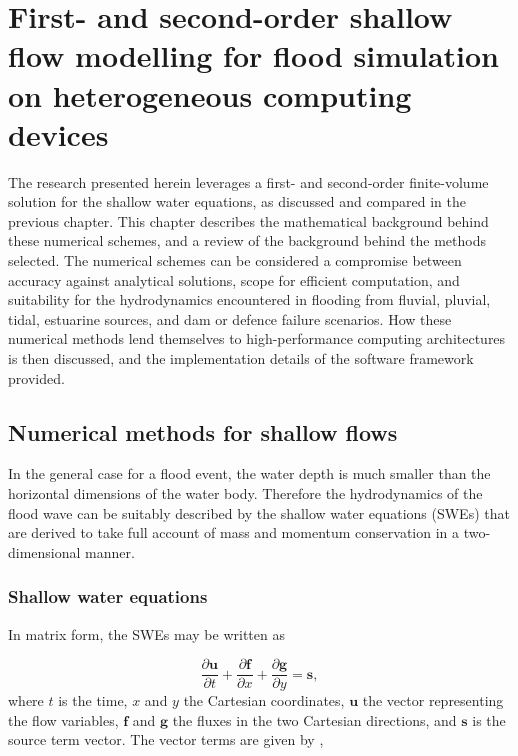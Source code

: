 \chapter{First- and second-order shallow flow modelling for flood simulation on heterogeneous computing devices}
\label{chapter:NumericalMethods}

The research presented herein leverages a first- and second-order finite-volume solution for the shallow water equations, as discussed and compared in the previous chapter. This chapter describes the mathematical background behind these numerical schemes, and a review of the background behind the methods selected. The numerical schemes can be considered a compromise between accuracy against analytical solutions, scope for efficient computation, and suitability for the hydrodynamics encountered in flooding from fluvial, pluvial, tidal, estuarine sources, and dam or defence failure scenarios. How these numerical methods lend themselves to high-performance computing architectures is then discussed, and the implementation details of the software framework provided.

\section{Numerical methods for shallow flows}

In the general case for a flood event, the water depth is much smaller than the horizontal dimensions of the water body. Therefore the hydrodynamics of the flood wave can be suitably described by the shallow water equations (SWEs) that are derived to take full account of mass and momentum conservation in a two-dimensional manner.

\subsection{Shallow water equations}

In matrix form, the SWEs may be written as

\begin{equation}
	\label{SWE_1stO}
	\frac{\partial\textbf{u}}{\partial t} +
	\frac{\partial\textbf{f}}{\partial x} +
	\frac{\partial\textbf{g}}{\partial y} =
	\textbf{s} ,
\end{equation}
where $t$ is the time, $x$ and $y$ the Cartesian coordinates, $\textbf{u}$ the vector representing the flow variables, $\textbf{f}$ and $\textbf{g}$ the fluxes in the two Cartesian directions, and $\textbf{s}$ is the source term vector. The vector terms are given by \citet{Liang2009b},

